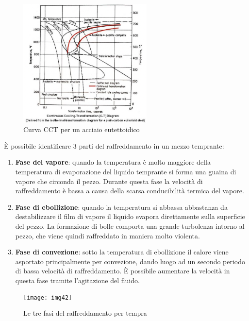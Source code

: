 \begin{figure}[!hbt]
    \includegraphics[width=0.6\textwidth]{images/img33.png}
    \caption{Curva CCT per un acciaio eutettoidico}
\end{figure}

È possibile identificare 3 parti del raffreddamento in un mezzo temprante:
\begin{enumerate}
    \item \textbf{Fase del vapore}: quando la temperatura è molto maggiore della temperatura di evaporazione del liquido temprante si forma una guaina di vapore che circonda il pezzo. Durante questa fase la velocità di raffreddamento è bassa a causa della scarsa conducibilità termica del vapore.
    \item \textbf{Fase di ebollizione}: quando la temperatura si abbassa abbastanza da destabilizzare il film di vapore il liquido evapora direttamente sulla superficie del pezzo. La formazione di bolle comporta una grande turbolenza intorno al pezzo, che viene quindi raffreddato in maniera molto violenta.
    \item \textbf{Fase di convezione}: sotto la temperatura di ebollizione il calore viene asportato principalmente per convezione, dando luogo ad un secondo periodo di bassa velocità di raffreddamento. È possibile aumentare la velocità in questa fase tramite l'agitazione del fluido.
\end{enumerate}

\begin{figure}[!hbt]
    \texttt{[image: img42]}
    \caption{Le tre fasi del raffreddamento per tempra}
\end{figure}


